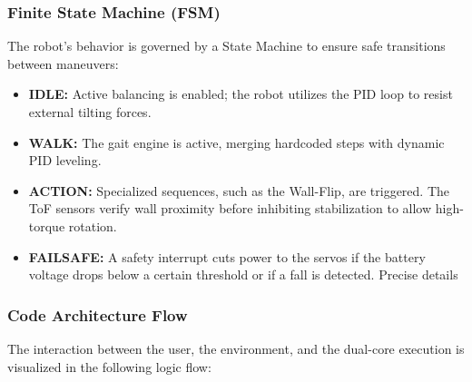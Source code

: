 \documentclass{article}
\begin{document}
\subsubsection{Finite State Machine (FSM)}
The robot's behavior is governed by a State Machine to ensure safe transitions between maneuvers:
\begin{itemize}
  \item \textbf{IDLE:} Active balancing is enabled; the robot utilizes the PID loop to resist external tilting forces.
  \item \textbf{WALK:} The gait engine is active, merging hardcoded steps with dynamic PID leveling.
  \item \textbf{ACTION:} Specialized sequences, such as the Wall-Flip, are triggered. The ToF sensors verify wall proximity before inhibiting stabilization to allow high-torque rotation.
  \item \textbf{FAILSAFE:} A safety interrupt cuts power to the servos if the battery voltage drops below a certain threshold or if a fall is detected. Precise details
\end{itemize}

\subsubsection{Code Architecture Flow}
The interaction between the user, the environment, and the dual-core execution
is visualized in the following logic flow:
\end{document}
